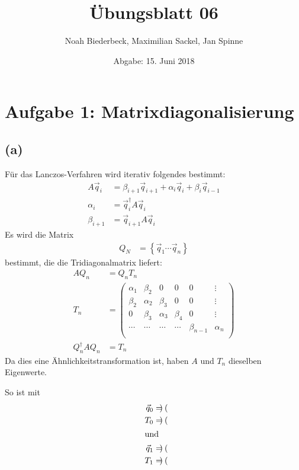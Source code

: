 \documentclass{scrartcl}
\title{Übungsblatt 06}
\author{%
		Noah Biederbeck, Maximilian Sackel, Jan Spinne
}
\date{Abgabe: 15. Juni 2018}
\begin{document}
\maketitle
\section*{Aufgabe 1: Matrixdiagonalisierung}
\subsection*{(a)}
Für das Lanczos-Verfahren wird iterativ folgendes bestimmt:
\begin{align}
  A \vec{q}_{i} &= \beta_{i+1} \vec{q}_{i+1} + \alpha_{i} \vec{q}_{i} + \beta_{i} \vec{q}_{i-1} \\
  \alpha_{i} &= \vec{q}_{i}^{\dagger} A \vec{q}_{i} \\
  \beta_{i+1} &= \vec{q}_{i+1} A \vec{q}_{i}
\end{align}
Es wird die Matrix
\begin{align}
  Q_{N} &= \left\{ \vec{q}_{1} \cdots \vec{q}_{n} \right\}
\end{align}
bestimmt, die die Tridiagonalmatrix liefert:
\begin{align}
  A Q_{n} &= Q_{n} T_{n} \\
  T_{n} &= 
    \left(\begin{matrix}
        \alpha_{1} & \beta_{2}  & 0          & 0         & 0           & \vdots     \\
        \beta_{2}  & \alpha_{2} & \beta_{3}  & 0         & 0           & \vdots     \\
        0          & \beta_{3}  & \alpha_{3} & \beta_{4} & 0           & \vdots     \\
        \cdots     & \cdots     & \cdots     & \cdots    & \beta_{n-1} & \alpha_{_{}n} \\
    \end{matrix}\right) \\
  Q_{n}^{\dagger} A Q_{n} &= T_{n}
\end{align}
Da dies eine Ähnlichkeitstransformation ist, haben $A$ und $T_{n}$ dieselben Eigenwerte.

So ist mit
\begin{align}
  \vec{q}_{0} &= \left(\begin{matrix}\end{matrix}\right) \\
  T_{0} &= \left(\begin{matrix}\end{matrix}\right) \\
  \intertext{und}
  \vec{q}_{1} &= \left(\begin{matrix}\end{matrix}\right) \\
  T_{1} &= \left(\begin{matrix}\end{matrix}\right)
\end{align}
\end{document}
